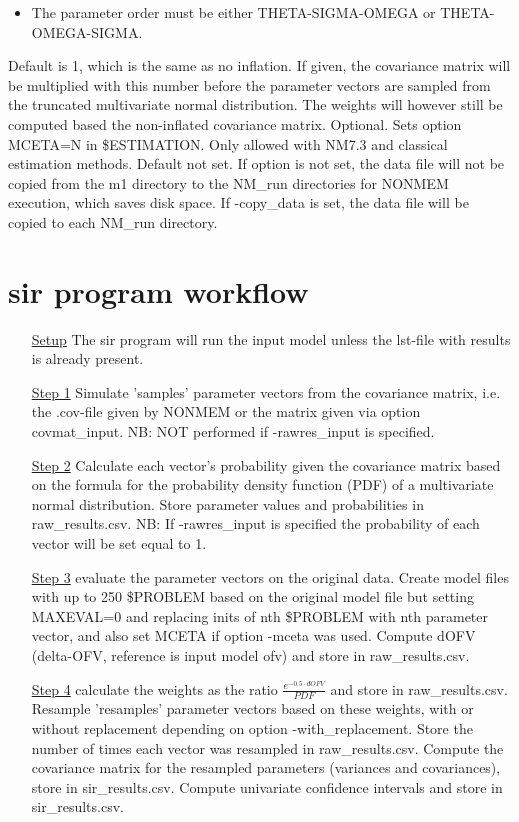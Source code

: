 \begin{optionlist}
\begin{itemize}
\item The parameter order must be either THETA-SIGMA-OMEGA or THETA-OMEGA-SIGMA.
\end{itemize}
\nextopt
{}
Default is 1, which is the same as no inflation. If given, the covariance
matrix will be multiplied with this number before the parameter vectors
are sampled from the truncated multivariate normal distribution.
The weights will however still be computed based the non-inflated covariance matrix. 
\nextopt
{}
Optional. Sets option MCETA=N in \$ESTIMATION. Only allowed with NM7.3 and classical estimation methods.
\nextopt
{}
Default not set. If option is not set, the data file will not be copied from the m1 directory to the NM\_run directories for NONMEM execution, which saves disk space. If -copy\_data is set, the data file will be copied to each NM\_run directory.
\nextopt
\end{optionlist}


\section{sir program workflow}
\begin{itemize}
\item[\underline{Setup}] The sir program will run the input model unless the lst-file with results is already present.
\item[\underline{Step 1}] Simulate 'samples' parameter vectors from the covariance matrix, i.e. the .cov-file given by NONMEM or the matrix given via option covmat\_input. 
NB: NOT performed if -rawres\_input is specified.
\item[\underline{Step 2}] Calculate each vector’s probability given the covariance matrix based on the formula for the probability 
density function (PDF) of a multivariate normal distribution. Store parameter values and probabilities in raw\_results.csv.
NB: If -rawres\_input is specified the probability of each vector will be set equal to 1.
\item[\underline{Step 3}] evaluate the parameter vectors on the original data.
Create model files with up to 250 \$PROBLEM based on the original model file but setting MAXEVAL=0
and replacing inits of nth \$PROBLEM with nth parameter vector, and also set MCETA if option -mceta was used. Compute dOFV 
(delta-OFV, reference is input model ofv) and store in raw\_results.csv.
\item[\underline{Step 4}] calculate the weights as the ratio $\frac{e^{-0.5\cdot dOFV}}{PDF}$ and store in raw\_results.csv. 
Resample 'resamples' parameter vectors based on these weights, with or without replacement depending on option -with\_replacement. 
Store the number of times each vector was resampled in raw\_results.csv.
Compute the covariance matrix for the resampled parameters (variances and covariances), 
store in sir\_results.csv. 
Compute univariate confidence intervals and store in sir\_results.csv.
\end{itemize}



